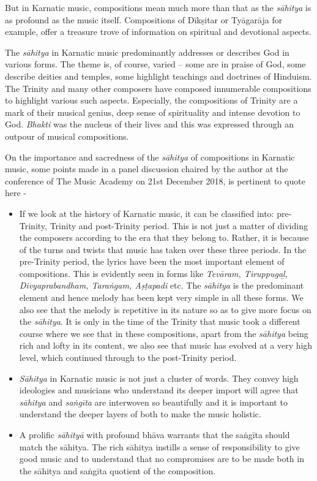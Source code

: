But in Karnatic music, compositions mean much more than that as the \textit{sāhitya} is as profound as the music itself. Compositions of Dīkṣitar or Tyāgarāja for example, offer a treasure trove of information on spiritual and devotional aspects.

The \textit{sāhitya} in Karnatic music predominantly addresses or describes God in various forms. The theme is, of course, varied – some are in praise of God, some describe deities and temples, some highlight teachings and doctrines of Hinduism. The Trinity and many other composers have composed innumerable compositions to highlight various such aspects. Especially, the compositions of Trinity are a mark of their musical genius, deep sense of spirituality and intense devotion to God. \textit{Bhakti} was the nucleus of their lives and this was expressed through an outpour of musical compositions.

On the importance and sacredness of the \textit{sāhitya} of compositions in Karnatic music, some points made in a panel discussion chaired by the author at the conference of The Music Academy on 21st December 2018, is pertinent to quote here -

\begin{itemize}
\itemsep=0pt
\item If we look at the history of Karnatic music, it can be classified into: pre-Trinity, Trinity and post-Trinity period. This is not just a matter of dividing the composers according to the era that they belong to. Rather, it is because of the turns and twists that music has taken over these three periods. In the pre-Trinity period, the lyrics have been the most important element of compositions. This is evidently seen in forms like \textit{Tevāram, Tiruppugaḻ, Divyaprabandham, Taraṅgam, Aṣṭapadi} etc. The \textit{sāhitya} is the predominant element and hence melody has been kept very simple in all these forms. We also see that the melody is repetitive in its nature so as to give more focus on the \textit{sāhitya}. It is only in the time of the Trinity that music took a different course where we see that in these compositions, apart from the \textit{sāhitya} being rich and lofty in its content, we also see that music has evolved at a very high level, which continued through to the post-Trinity period.

 \item \textit{Sāhitya} in Karnatic music is not just a cluster of words. They convey high ideologies and musicians who understand its deeper import will agree that \textit{sāhitya} and \textit{saṅgīta} are interwoven so beautifully and it is important to understand the deeper layers of both to make the music holistic.

 \item A prolific \textit{sāhityā} with profound bhāva warrants that the saṅgīta should match the sāhitya. The rich sāhitya instills a sense of responsibility to give good music and to understand that no compromises are to be made both in the sāhitya and saṅgīta quotient of the composition.

\end{itemize}

